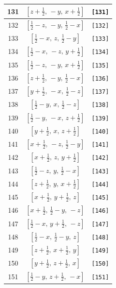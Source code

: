 \documentclass[fleqn,8pt]{jsarticle}
\begin{document}
\begin{longtable}{ccc}
131 & $\left[ z + \frac{1}{2},\, - y,\, x + \frac{1}{2} \right]$ & {\tt [131]} \\ \hline
132 & $\left[ \frac{1}{2} - z,\, - y,\, \frac{1}{2} - x \right]$ & {\tt [132]} \\ \hline
133 & $\left[ \frac{1}{2} - x,\, z,\, \frac{1}{2} - y \right]$ & {\tt [133]} \\ \hline
134 & $\left[ \frac{1}{2} - x,\, - z,\, y + \frac{1}{2} \right]$ & {\tt [134]} \\ \hline
135 & $\left[ \frac{1}{2} - z,\, - y,\, x + \frac{1}{2} \right]$ & {\tt [135]} \\ \hline
136 & $\left[ z + \frac{1}{2},\, - y,\, \frac{1}{2} - x \right]$ & {\tt [136]} \\ \hline
137 & $\left[ y + \frac{1}{2},\, - x,\, \frac{1}{2} - z \right]$ & {\tt [137]} \\ \hline
138 & $\left[ \frac{1}{2} - y,\, x,\, \frac{1}{2} - z \right]$ & {\tt [138]} \\ \hline
139 & $\left[ \frac{1}{2} - y,\, - x,\, z + \frac{1}{2} \right]$ & {\tt [139]} \\ \hline
140 & $\left[ y + \frac{1}{2},\, x,\, z + \frac{1}{2} \right]$ & {\tt [140]} \\ \hline
141 & $\left[ x + \frac{1}{2},\, - z,\, \frac{1}{2} - y \right]$ & {\tt [141]} \\ \hline
142 & $\left[ x + \frac{1}{2},\, z,\, y + \frac{1}{2} \right]$ & {\tt [142]} \\ \hline
143 & $\left[ \frac{1}{2} - z,\, y,\, \frac{1}{2} - x \right]$ & {\tt [143]} \\ \hline
144 & $\left[ z + \frac{1}{2},\, y,\, x + \frac{1}{2} \right]$ & {\tt [144]} \\ \hline
145 & $\left[ x + \frac{1}{2},\, y + \frac{1}{2},\, z \right]$ & {\tt [145]} \\ \hline
146 & $\left[ x + \frac{1}{2},\, \frac{1}{2} - y,\, - z \right]$ & {\tt [146]} \\ \hline
147 & $\left[ \frac{1}{2} - x,\, y + \frac{1}{2},\, - z \right]$ & {\tt [147]} \\ \hline
148 & $\left[ \frac{1}{2} - x,\, \frac{1}{2} - y,\, z \right]$ & {\tt [148]} \\ \hline
149 & $\left[ z + \frac{1}{2},\, x + \frac{1}{2},\, y \right]$ & {\tt [149]} \\ \hline
150 & $\left[ y + \frac{1}{2},\, z + \frac{1}{2},\, x \right]$ & {\tt [150]} \\ \hline
151 & $\left[ \frac{1}{2} - y,\, z + \frac{1}{2},\, - x \right]$ & {\tt [151]} \\ \hline

\end{longtable}
\end{document}
